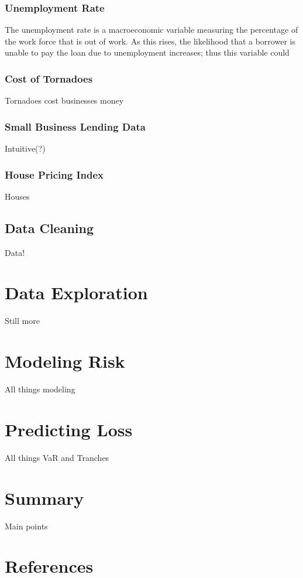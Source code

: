\documentclass[]{report}
\begin{document}
		\subsubsection*{Unemployment Rate}
		\tab The unemployment rate is a macroeconomic variable measuring the percentage of the work force that is out of work. As this rises, the likelihood that a borrower is unable to pay the loan due to unemployment increases; thus this variable could 
		
		\subsubsection*{Cost of Tornadoes}
		Tornadoes cost businesses money
		
		\subsubsection*{Small Business Lending Data}
		Intuitive(?)
		
		\subsubsection*{House Pricing Index}
		Houses 
	
	
	\subsection*{Data Cleaning}
		Data!
	
\section*{Data Exploration}
	Still more
	
\section*{Modeling Risk}
	All things modeling

\section*{Predicting Loss}
	All things VaR and Tranches
	
\section*{Summary}
	Main points
	
\section*{References}
	
\end{document}
